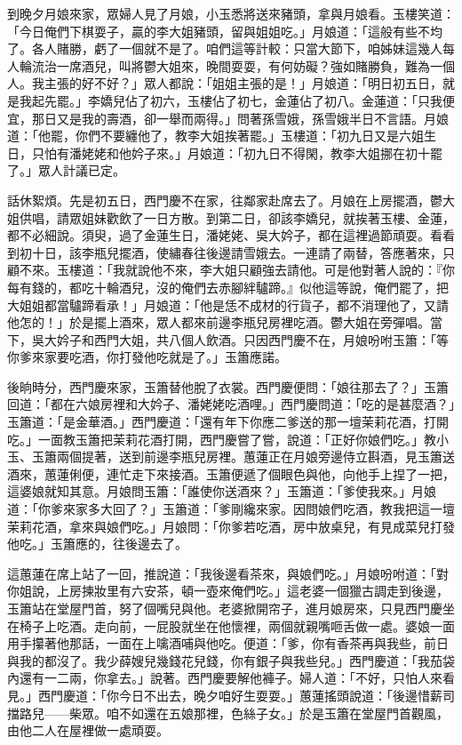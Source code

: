 到晚夕月娘來家，眾婦人見了月娘，小玉悉將送來豬頭，拿與月娘看。玉樓笑道：「今日俺們下棋耍子，贏的李大姐豬頭，留與姐姐吃。」月娘道：「這般有些不均了。各人賭勝，虧了一個就不是了。咱們這等計較：只當大節下，咱姊妹這幾人每人輪流治一席酒兒，叫將鬱大姐來，晚間耍耍，有何妨礙？強如賭勝負，難為一個人。我主張的好不好？」眾人都說：「姐姐主張的是！」月娘道：「明日初五日，就是我起先罷。」李嬌兒佔了初六，玉樓佔了初七，金蓮佔了初八。金蓮道：「只我便宜，那日又是我的壽酒，卻一舉而兩得。」問著孫雪娥，孫雪娥半日不言語。月娘道：「他罷，你們不要纏他了，教李大姐挨著罷。」玉樓道：「初九日又是六姐生日，只怕有潘姥姥和他妗子來。」月娘道：「初九日不得閑，教李大姐挪在初十罷了。」眾人計議已定。

話休絮煩。先是初五日，西門慶不在家，往鄰家赴席去了。月娘在上房擺酒，鬱大姐供唱，請眾姐妹歡飲了一日方散。到第二日，卻該李嬌兒，就挨著玉樓、金蓮，都不必細說。須臾，過了金蓮生日，潘姥姥、吳大妗子，都在這裡過節頑耍。看看到初十日，該李瓶兒擺酒，使繡春往後邊請雪娥去。一連請了兩替，答應著來，只顧不來。玉樓道：「我就說他不來，李大姐只顧強去請他。可是他對著人說的：『你每有錢的，都吃十輪酒兒，沒的俺們去赤腳絆驢蹄。』似他這等說，俺們罷了，把大姐姐都當驢蹄看承！」月娘道：「他是恁不成材的行貨子，都不消理他了，又請他怎的！」於是擺上酒來，眾人都來前邊李瓶兒房裡吃酒。鬱大姐在旁彈唱。當下，吳大妗子和西門大姐，共八個人飲酒。只因西門慶不在，月娘吩咐玉簫：「等你爹來家要吃酒，你打發他吃就是了。」玉簫應諾。

後晌時分，西門慶來家，玉簫替他脫了衣裳。西門慶便問：「娘往那去了？」玉簫回道：「都在六娘房裡和大妗子、潘姥姥吃酒哩。」西門慶問道：「吃的是甚麼酒？」玉簫道：「是金華酒。」西門慶道：「還有年下你應二爹送的那一壇茉莉花酒，打開吃。」一面教玉簫把茉莉花酒打開，西門慶嘗了嘗，說道：「正好你娘們吃。」教小玉、玉簫兩個提著，送到前邊李瓶兒房裡。蕙蓮正在月娘旁邊侍立斟酒，見玉簫送酒來，蕙蓮俐便，連忙走下來接酒。玉簫便遞了個眼色與他，向他手上捏了一把，這婆娘就知其意。月娘問玉簫：「誰使你送酒來？」玉簫道：「爹使我來。」月娘道：「你爹來家多大回了？」玉簫道：「爹剛纔來家。因問娘們吃酒，教我把這一壇茉莉花酒，拿來與娘們吃。」月娘問：「你爹若吃酒，房中放桌兒，有見成菜兒打發他吃。」玉簫應的，往後邊去了。

這蕙蓮在席上站了一回，推說道：「我後邊看茶來，與娘們吃。」月娘吩咐道：「對你姐說，上房揀妝里有六安茶，頓一壺來俺們吃。」這老婆一個獵古調走到後邊，玉簫站在堂屋門首，努了個嘴兒與他。老婆掀開帘子，進月娘房來，只見西門慶坐在椅子上吃酒。走向前，一屁股就坐在他懷裡，兩個就親嘴咂舌做一處。婆娘一面用手攥著他那話，一面在上噙酒哺與他吃。便道：「爹，你有香茶再與我些，前日與我的都沒了。我少薛嫂兒幾錢花兒錢，你有銀子與我些兒。」西門慶道：「我茄袋內還有一二兩，你拿去。」說著。西門慶要解他褲子。婦人道：「不好，只怕人來看見。」西門慶道：「你今日不出去，晚夕咱好生耍耍。」蕙蓮搖頭說道：「後邊惜薪司擋路兒——柴眾。咱不如還在五娘那裡，色絲子女。」於是玉簫在堂屋門首觀風，由他二人在屋裡做一處頑耍。

